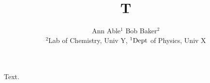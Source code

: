 \documentclass{article}
\begin{document}
\title{T}
\author{Ann Able$^{1}$ Bob Baker$^{2}$\\ $^{2}$Lab of Chemistry, Univ Y, ${\rm ^{1}Dept}$ of Physics, Univ X}
\maketitle
Text.
\end{document}
